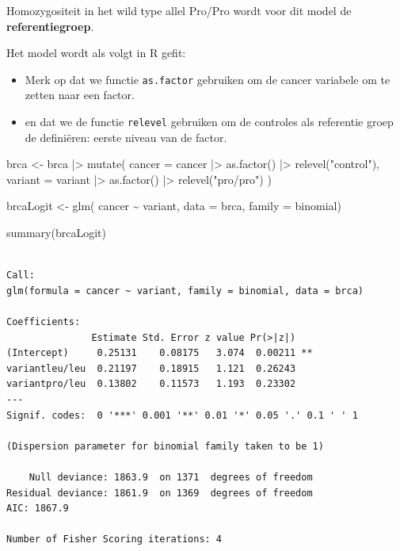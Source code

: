 \documentclass[
  dutch,
  letterpaper,
  12pt]{book}
\newenvironment{Shaded}{\begin{snugshade}}{\end{snugshade}}
\newcommand{\AttributeTok}[1]{\textcolor[rgb]{0.40,0.45,0.13}{#1}}
\newcommand{\FunctionTok}[1]{\textcolor[rgb]{0.28,0.35,0.67}{#1}}
\newcommand{\NormalTok}[1]{\textcolor[rgb]{0.00,0.23,0.31}{#1}}
\newcommand{\OtherTok}[1]{\textcolor[rgb]{0.00,0.23,0.31}{#1}}
\newcommand{\SpecialCharTok}[1]{\textcolor[rgb]{0.37,0.37,0.37}{#1}}
\newcommand{\StringTok}[1]{\textcolor[rgb]{0.13,0.47,0.30}{#1}}
\providecommand{\tightlist}{%
  \setlength{\itemsep}{0pt}\setlength{\parskip}{0pt}}
\theoremstyle{definition}
\theoremstyle{definition}
\theoremstyle{definition}
\theoremstyle{remark}
\begin{document}
Homozygositeit in het wild type allel Pro/Pro wordt voor dit model de
\textbf{referentiegroep}.

Het model wordt als volgt in R gefit:

\begin{itemize}
\tightlist
\item
  Merk op dat we functie \texttt{as.factor} gebruiken om de cancer
  variabele om te zetten naar een factor.
\item
  en dat we de functie \texttt{relevel} gebruiken om de controles als
  referentie groep de definiëren: eerste niveau van de factor.
\end{itemize}

\begin{Shaded}
\begin{Highlighting}[]
\NormalTok{brca }\OtherTok{\textless{}{-}}\NormalTok{ brca }\SpecialCharTok{|\textgreater{}}
  \FunctionTok{mutate}\NormalTok{(}
    \AttributeTok{cancer =}\NormalTok{ cancer }\SpecialCharTok{|\textgreater{}}
      \FunctionTok{as.factor}\NormalTok{() }\SpecialCharTok{|\textgreater{}}
      \FunctionTok{relevel}\NormalTok{(}\StringTok{"control"}\NormalTok{),}
    \AttributeTok{variant =}\NormalTok{ variant }\SpecialCharTok{|\textgreater{}}
      \FunctionTok{as.factor}\NormalTok{() }\SpecialCharTok{|\textgreater{}}
      \FunctionTok{relevel}\NormalTok{(}\StringTok{"pro/pro"}\NormalTok{)}
\NormalTok{  )}

\NormalTok{brcaLogit }\OtherTok{\textless{}{-}} \FunctionTok{glm}\NormalTok{(}
\NormalTok{  cancer }\SpecialCharTok{\textasciitilde{}}\NormalTok{ variant,}
  \AttributeTok{data =}\NormalTok{ brca,}
  \AttributeTok{family =}\NormalTok{ binomial)}

\FunctionTok{summary}\NormalTok{(brcaLogit)}
\end{Highlighting}
\end{Shaded}

\begin{verbatim}

Call:
glm(formula = cancer ~ variant, family = binomial, data = brca)

Coefficients:
               Estimate Std. Error z value Pr(>|z|)   
(Intercept)     0.25131    0.08175   3.074  0.00211 **
variantleu/leu  0.21197    0.18915   1.121  0.26243   
variantpro/leu  0.13802    0.11573   1.193  0.23302   
---
Signif. codes:  0 '***' 0.001 '**' 0.01 '*' 0.05 '.' 0.1 ' ' 1

(Dispersion parameter for binomial family taken to be 1)

    Null deviance: 1863.9  on 1371  degrees of freedom
Residual deviance: 1861.9  on 1369  degrees of freedom
AIC: 1867.9

Number of Fisher Scoring iterations: 4
\end{verbatim}
\end{document}
